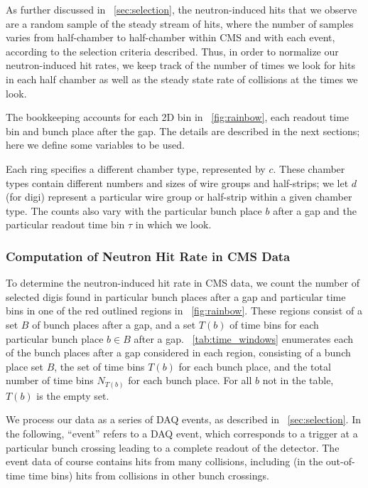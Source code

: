 As further discussed in \Sec~\ref{sec:selection}, the
neutron-induced hits that we observe are a random sample of the steady
stream of hits, where the number of samples varies from half-chamber
to half-chamber within CMS and with each event, according to the
selection criteria described. Thus, in order to normalize our
neutron-induced hit rates, we keep track of the number of times we
look for hits in each half chamber as well as the steady state rate
of \pp collisions at the times we look.

The bookkeeping accounts for each 2D bin in \FigDot~\ref{fig:rainbow},
each readout time bin and bunch place after the gap.  The details are
described in the next sections; here we define some variables to be
used.

Each ring specifies a different chamber type, represented by
$c$. These chamber types contain different numbers and sizes of wire
groups and half-strips; we let $d$ (for digi) represent a particular
wire group or half-strip within a given chamber type. The counts also
vary with the particular bunch place $b$ after a gap and the
particular readout time bin $\tau$ in which we look.

\subsubsection{Computation of Neutron Hit Rate in CMS Data}

To determine the neutron-induced hit rate in CMS data, we count the
number of selected digis found in particular bunch places after a gap
and particular time bins in one of the red outlined regions in
\FigDot~\ref{fig:rainbow}. These regions consist of a set $B$ of bunch
places after a gap, and a set $T(b)$ of time bins for each particular
bunch place $b\in B$ after a gap. \Tab~\ref{tab:time_windows}
enumerates each of the bunch places after a gap considered in each
region, consisting of a bunch place set $B$, the set of time bins
$T(b)$ for each bunch place, and the total number of time bins
$N_{T(b)}$ for each bunch place.  For all $b$ not in the table, $T(b)$
is the empty set.

We process our data as a series of DAQ events, as described in
\Sec~\ref{sec:selection}.  In the following, ``event'' refers to a
DAQ event, which corresponds to a trigger at a particular bunch
crossing leading to a complete readout of the detector. The event data
of course contains hits from many \pp collisions, including (in the
out-of-time time bins) hits from \pp collisions in other bunch
crossings.

